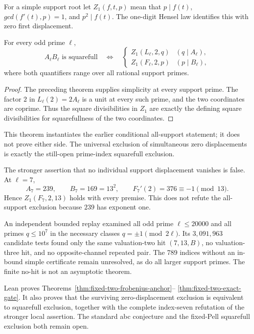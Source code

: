 For a simple support root let $Z_1(f,t,p)$ mean that
$p\mid f(t)$, $gcd(f'(t),p)=1$, and $p^2\mid f(t)$.  The one-digit Hensel
law identifies this with zero first displacement.

\begin{theorem}
\label{thm:fixed-two-exact-gate}
For every odd prime $\ell$,
\[
 A_\ell B_\ell\text{ is squarefull}
 \quad\Longleftrightarrow\quad
 \begin{cases}
 Z_1(L_\ell,2,q)&(q\mid A_\ell),\\
 Z_1(F_\ell,2,p)&(p\mid B_\ell),
 \end{cases}
\]
where both quantifiers range over all rational support primes.
\end{theorem}

\begin{proof}
The preceding theorem supplies simplicity at every support prime.  The
factor $2$ in $L_\ell(2)=2A_\ell$ is a unit at every such prime, and the two
coordinates are coprime.  Thus the square divisibilities in $Z_1$ are
exactly the defining square divisibilities for squarefullness of the two
coordinates.
\end{proof}

This theorem instantiates the earlier conditional all-support statement; it
does not prove either side.  The universal exclusion of simultaneous zero
displacements is exactly the still-open prime-index squarefull exclusion.

The stronger assertion that no individual support displacement vanishes is
false.  At $\ell=7$,
\[
 A_7=239,\qquad B_7=169=13^2,
 \qquad F_7'(2)=376\equiv-1\pmod {13}.
\]
Hence $Z_1(F_7,2,13)$ holds with every premise.  This does not refute the
all-support exclusion because $239$ has exponent one.

An independent bounded replay examined all odd prime
$\ell\le20000$ and all primes $q\le10^7$ in the necessary classes
$q=\pm1\pmod{2\ell}$.  Its $3{,}091{,}963$ candidate tests found only the
same valuation-two hit $(7,13,B)$, no valuation-three hit, and no
opposite-channel repeated pair.  The 789 indices without an in-bound simple
certificate remain unresolved, as do all larger support primes.  The
finite no-hit is not an asymptotic theorem.

Lean proves Theorems~\ref{thm:fixed-two-frobenius-anchor}--
\ref{thm:fixed-two-exact-gate}.  It also proves that the surviving
zero-displacement exclusion is equivalent to squarefull exclusion, together
with the complete index-seven refutation of the stronger local assertion.
The standard abc conjecture and the fixed-Pell squarefull exclusion both
remain open.
